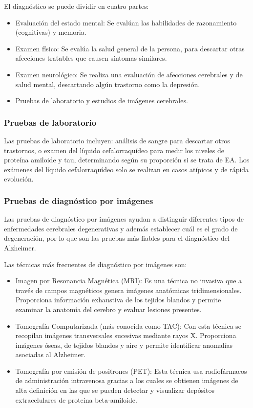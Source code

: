 El diagnóstico se puede dividir en cuatro partes:
\begin{itemize}
    \item Evaluación del estado mental: Se evalúan las habilidades de razonamiento (cognitivas) y memoria.
    \item Examen físico: Se evalúa la salud general de la persona, para descartar otras afecciones tratables que causen
    síntomas similares.
    \item Examen neurológico: Se realiza una evaluación de afecciones cerebrales y de salud mental, descartando algún
    trastorno como la depresión.
    \item Pruebas de laboratorio y estudios de imágenes cerebrales.\\
\end{itemize}

\subsubsection{Pruebas de laboratorio}\label{subsubsec:pruebas-laboratorio-EA}
Las pruebas de laboratorio incluyen: análisis de sangre para descartar otros trastornos, o examen del líquido
cefalorraquídeo para medir los niveles de proteína amiloide y tau, determinando según su proporción si se trata de EA.
Los exámenes del líquido cefalorraquídeo solo se realizan en casos atípicos y de rápida evolución.

\subsubsection{Pruebas de diagnóstico por imágenes}\label{subsubsec:pruebas-imagenes-EA}
Las pruebas de diagnóstico por imágenes ayudan a distinguir diferentes tipos de enfermedades cerebrales degenerativas y
además establecer cuál es el grado de degeneración, por lo que son las pruebas más fiables para el diagnóstico del
Alzheimer.

Las técnicas más frecuentes de diagnóstico por imágenes son:
\begin{itemize}
    \item Imagen por Resonancia Magnética (MRI): Es una técnica no invasiva que a través de campos magnéticos genera imágenes
    anatómicas tridimensionales.
    Proporciona información exhaustiva de los tejidos blandos y permite examinar la anatomía del cerebro y evaluar
    lesiones presentes.
    \item Tomografía Computarizada (más conocida como TAC): Con esta técnica se recopilan imágenes transversales
    sucesivas mediante rayos X. Proporciona imágenes óseas, de tejidos blandos y aire y permite identificar anomalías
    asociadas al Alzheimer.
    \item Tomografía por emisión de positrones (PET): Esta técnica usa radiofármacos de administración intravenosa
    gracias a los cuales se obtienen imágenes de alta definición en las que se pueden detectar y visualizar depósitos
    extracelulares de proteína beta-amiloide.\\
\end{itemize}

